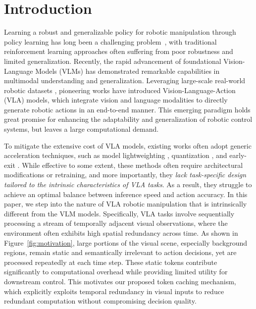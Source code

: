 \section{Introduction}

Learning a robust and generalizable policy for robotic manipulation through policy learning has long been a challenging problem~\cite{kim2020domain}, with traditional reinforcement learning approaches \cite{choi2024domain,bica2021invariant} often suffering from poor robustness and limited generalization. Recently, the rapid advancement of foundational Vision-Language Models (VLMs) \cite{awadalla2023openflamingo,liu2024visual} has demonstrated remarkable capabilities in multimodal understanding and generalization. Leveraging large-scale real-world robotic datasets \cite{o2024open,fang2024rh20t}, pioneering works \cite{zitkovich2023rt,octo_2023,niu2024llarva,kim24openvla} have introduced Vision-Language-Action (VLA) models, which integrate vision and language modalities to directly generate robotic actions in an end-to-end manner. This emerging paradigm holds great promise for enhancing the adaptability and generalization of robotic control systems, but leaves a large computational demand.

To mitigate the extensive cost of VLA models, existing works often adopt generic acceleration techniques, such as model lightweighting \cite{wen2024tinyvla}, quantization \cite{park2024quantization}, and early-exit \cite{DeeR-VLA}. While effective to some extent, these methods often require architectural modifications or retraining, and more importantly, they \textit{lack task-specific design tailored to the intrinsic characteristics of VLA tasks}. As a result, they struggle to achieve an optimal balance between inference speed and action accuracy.
In this paper, we step into the nature of VLA robotic manipulation that is intrinsically different from the VLM models. Specifically, VLA tasks involve sequentially processing a stream of temporally adjacent visual observations, where the environment often exhibits high spatial redundancy across time. As shown in Figure~\ref{fig:motivation}, large portions of the visual scene, especially background regions, remain static and semantically irrelevant to action decisions, yet are processed repeatedly at each time step. These static tokens contribute significantly to computational overhead while providing limited utility for downstream control. This motivates our proposed token caching mechanism, which explicitly exploits temporal redundancy in visual inputs to reduce redundant computation without compromising decision quality.

